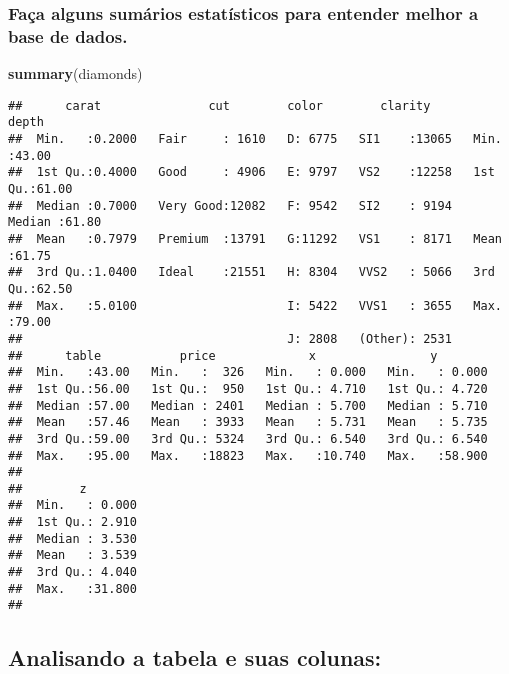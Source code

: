 \documentclass[
]{article}
\newenvironment{Shaded}{\begin{snugshade}}{\end{snugshade}}
\newcommand{\KeywordTok}[1]{\textcolor[rgb]{0.13,0.29,0.53}{\textbf{#1}}}
\newcommand{\NormalTok}[1]{#1}
\begin{document}
\hypertarget{fauxe7a-alguns-sumuxe1rios-estatuxedsticos-para-entender-melhor-a-base-de-dados.}{%
\subsubsection{Faça alguns sumários estatísticos para entender melhor a
base de
dados.}\label{fauxe7a-alguns-sumuxe1rios-estatuxedsticos-para-entender-melhor-a-base-de-dados.}}

\begin{Shaded}
\begin{Highlighting}[]
\KeywordTok{summary}\NormalTok{(diamonds)}
\end{Highlighting}
\end{Shaded}

\begin{verbatim}
##      carat               cut        color        clarity          depth      
##  Min.   :0.2000   Fair     : 1610   D: 6775   SI1    :13065   Min.   :43.00  
##  1st Qu.:0.4000   Good     : 4906   E: 9797   VS2    :12258   1st Qu.:61.00  
##  Median :0.7000   Very Good:12082   F: 9542   SI2    : 9194   Median :61.80  
##  Mean   :0.7979   Premium  :13791   G:11292   VS1    : 8171   Mean   :61.75  
##  3rd Qu.:1.0400   Ideal    :21551   H: 8304   VVS2   : 5066   3rd Qu.:62.50  
##  Max.   :5.0100                     I: 5422   VVS1   : 3655   Max.   :79.00  
##                                     J: 2808   (Other): 2531                  
##      table           price             x                y         
##  Min.   :43.00   Min.   :  326   Min.   : 0.000   Min.   : 0.000  
##  1st Qu.:56.00   1st Qu.:  950   1st Qu.: 4.710   1st Qu.: 4.720  
##  Median :57.00   Median : 2401   Median : 5.700   Median : 5.710  
##  Mean   :57.46   Mean   : 3933   Mean   : 5.731   Mean   : 5.735  
##  3rd Qu.:59.00   3rd Qu.: 5324   3rd Qu.: 6.540   3rd Qu.: 6.540  
##  Max.   :95.00   Max.   :18823   Max.   :10.740   Max.   :58.900  
##                                                                   
##        z         
##  Min.   : 0.000  
##  1st Qu.: 2.910  
##  Median : 3.530  
##  Mean   : 3.539  
##  3rd Qu.: 4.040  
##  Max.   :31.800  
## 
\end{verbatim}

\hypertarget{analisando-a-tabela-e-suas-colunas}{%
\subsection{Analisando a tabela e suas
colunas:}\label{analisando-a-tabela-e-suas-colunas}}
\end{document}

